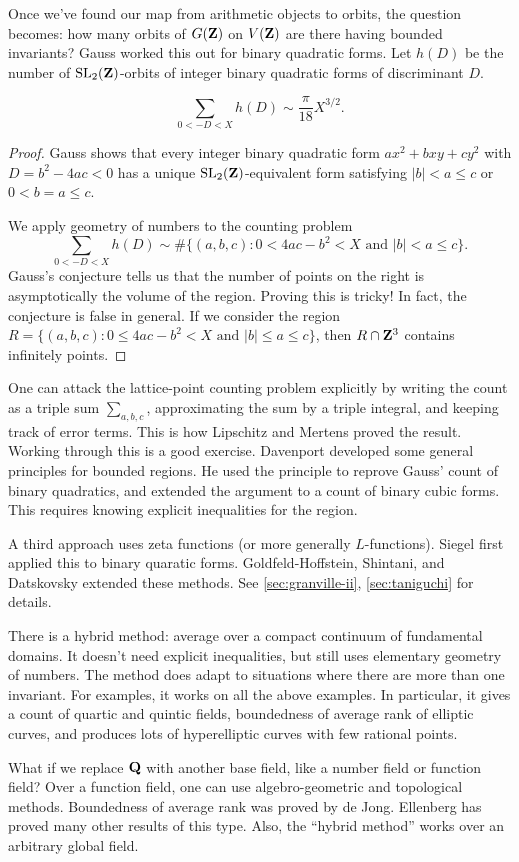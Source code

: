Once we've found our map from arithmetic objects to orbits, the question 
becomes: how many orbits of $G(\mathbf{Z})$ on $V(\mathbf{Z})$ are there having bounded 
invariants? Gauss worked this out for binary quadratic forms. Let $h(D)$ be 
the number of $\operatorname{SL}_2(\mathbf{Z})$-orbits of integer binary quadratic forms of 
discriminant $D$. 

\begin{theo}
\[
  \sum_{0<-D<X} h(D) \sim \frac{\pi}{18} X^{3/2} .
\]
\end{theo}
\begin{proof}
Gauss shows that every integer binary quadratic form $a x^2+b x y+c y^2$ 
with $D=b^2-4 a c<0$ has a unique $\operatorname{SL}_2(\mathbf{Z})$-equivalent form 
satisfying $|b|<a\leqslant c$ or $0<b=a\leqslant c$. 

We apply geometry of numbers to the counting problem 
\[
  \sum_{0<-D<X} h(D) \sim \# \{(a,b,c):0<4 a c-b^2<X\text{ and }|b|<a\leqslant c\} .
\]
Gauss's conjecture tells us that the number of points on the right is 
asymptotically the volume of the region. Proving this is tricky! In fact, the 
conjecture is false in general. If we consider the region 
$R=\{(a,b,c):0\leqslant 4 a c-b^2<X\text{ and }|b|\leqslant a \leqslant c\}$, 
then $R\cap \mathbf{Z}^3$ contains infinitely points. 
\end{proof}

One can attack the lattice-point counting problem explicitly by writing the 
count as a triple sum $\sum_{a,b,c}$, approximating the sum by a triple 
integral, and keeping track of error terms. This is how Lipschitz and Mertens 
proved the result. Working through this is a good exercise. Davenport developed 
some general principles for bounded regions. He used the principle to reprove 
Gauss' count of binary quadratics, and extended the argument to a count of 
binary cubic forms. This requires knowing explicit inequalities for the region. 

A third approach uses zeta functions (or more generally $L$-functions). 
Siegel first applied this to binary quaratic forms. Goldfeld-Hoffstein, 
Shintani, and Datskovsky extended these methods. See 
\autoref{sec:granville-ii}, \autoref{sec:taniguchi} for details. 

There is a hybrid method: average over a compact continuum of fundamental 
domains. It doesn't need explicit inequalities, but still uses elementary 
geometry of numbers. The method does adapt to situations where there are more 
than one invariant. For examples, it works on all the above examples. In 
particular, it gives a count of quartic and quintic fields, boundedness of 
average rank of elliptic curves, and produces lots of hyperelliptic curves with 
few rational points. 

What if we replace $\mathbf{Q}$ with another base field, like a number field or 
function field? Over a function field, one can use algebro-geometric and 
topological methods. Boundedness of average rank was proved by de Jong. 
Ellenberg has proved many other results of this type. Also, the ``hybrid 
method'' works over an arbitrary global field. %




